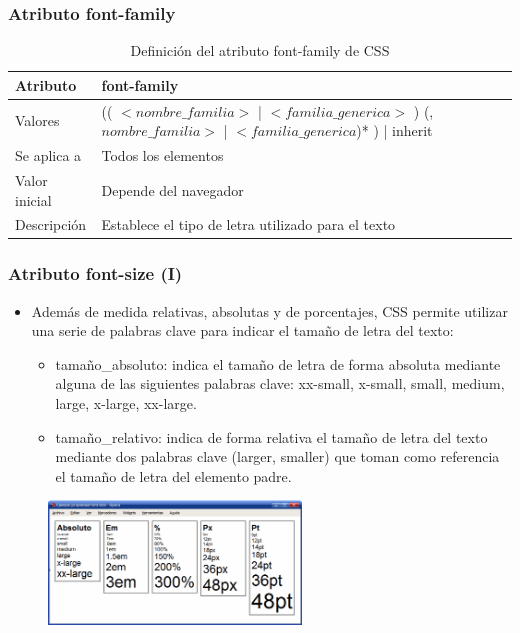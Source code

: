 \documentclass[ucs]{beamer}
\begin{document}

\begin{frame}
\frametitle{Atributo font-family}

\begin{center}
  \begin{table}
   \begin{tabular}{p{1.8cm}p{7.8cm}}
Atributo & \bf{font-family} \\ \hline
Valores& (( $<nombre\_familia>$ | $<familia\_generica>$ ) (,$nombre\_familia>$ | $<familia\_generica$)* ) | inherit \\ \hline
Se aplica a& Todos los elementos \\ \hline
Valor inicial& Depende del navegador \\ \hline
Descripción& Establece el tipo de letra utilizado para el texto \\ \hline
  \end{tabular}
   \caption{Definición del atributo font-family de CSS}
 \end{table}
\end{center}


\end{frame}



\begin{frame}
\frametitle{Atributo font-size (I)}

\begin{itemize}
  \item Además de medida relativas, absolutas y de porcentajes, CSS permite utilizar una serie de palabras clave para indicar el tamaño de letra del texto:
  \begin{itemize}
    \item tamaño\_absoluto: indica el tamaño de letra de forma absoluta mediante alguna de las siguientes palabras clave: xx-small, x-small, small, medium, large, x-large, xx-large.
    \item tamaño\_relativo: indica de forma relativa el tamaño de letra del texto mediante dos palabras clave (larger, smaller) que toman como referencia el tamaño de letra del elemento padre.
  \end{itemize}
\end{itemize}


\begin{center}
\begin{figure}[p]
\includegraphics[width=0.6\textwidth]{figs/f0601.png}
\end{figure}
\end{center}

\end{frame}
\end{document}
